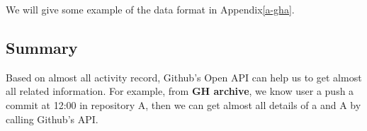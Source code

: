We will give some example of the data format in Appendix\ref{a-gha}.


\subsection{Summary}
Based on almost all activity record, Github's Open API can help us to get almost all related information. For example, from \textbf{GH archive}, we know user a push a commit at 12:00 in repository A, then we can get almost all details of a and A by calling Github's API.






